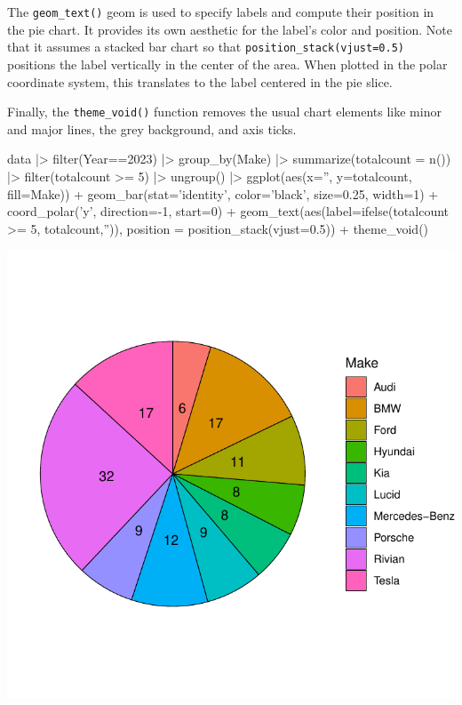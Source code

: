 The \texttt{geom\_text()} geom is used to specify labels and compute their position in the pie chart. It provides its own aesthetic for the label's color and position. Note that it assumes a stacked bar chart so that \texttt{position\_stack(vjust=0.5)} positions the label vertically in the center of the area. When plotted in the polar coordinate system, this translates to the label centered in the pie slice. 

Finally, the \texttt{theme\_void()} function removes the usual chart elements like minor and major lines, the grey background, and axis ticks. 

\begin{samepage}
\begin{Rcode}
data |>
  filter(Year==2023) |>
  group_by(Make) |>
  summarize(totalcount = n()) |>
  filter(totalcount >= 5) |>
  ungroup() |>
  ggplot(aes(x='', y=totalcount, fill=Make)) +
    geom_bar(stat='identity', color='black', size=0.25, width=1) + 
    coord_polar('y', direction=-1, start=0) +
    geom_text(aes(label=ifelse(totalcount >= 5, totalcount,'')), 
                  position = position_stack(vjust=0.5)) +
    theme_void()
\end{Rcode}
\end{samepage}

\begin{center}
  \includegraphics[width=.5\textwidth]{fuel.pie.pdf}
\end{center}


